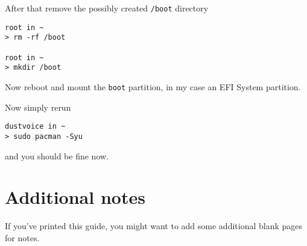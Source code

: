 \documentclass[10pt]{dustdoc}
\begin{document}
After that remove the possibly created \texttt{/boot} directory

\begin{verbatim}
root in ~
> rm -rf /boot

root in ~
> mkdir /boot
\end{verbatim}


Now reboot and mount the \texttt{boot} partition, in my case an EFI System partition.

Now simply rerun

\begin{verbatim}
dustvoice in ~
> sudo pacman -Syu
\end{verbatim}


\noindent
and you should be fine now.

\chapter{Additional notes}%
\label{sec:additional-notes}

If you’ve printed this guide, you might want to add some additional blank pages for notes.
\end{document}
